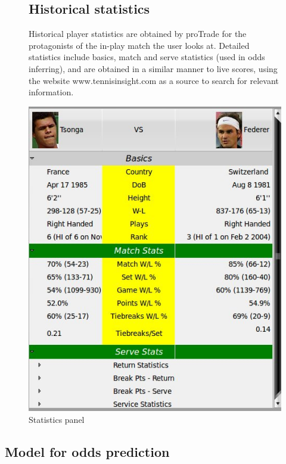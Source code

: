\documentclass[10pt]{report}
\begin{document}
\begin{figure}[ht]
\begin{minipage}[b]{7 cm}
\subsection {Historical statistics}
Historical player statistics are obtained by proTrade for the protagonists of the in-play match the user looks at. Detailed statistics include basics, match and serve statistics (used in odds inferring), and are obtained in a similar manner to live scores, using the website www.tennisinsight.com  as a source to search for relevant information.  
\end{minipage}
\begin{minipage}[b]{5 cm}
\centering
\includegraphics[bb=0 0 650 600, scale = 0.30]{features-screenshots/stats.jpg}
\caption{Statistics panel}
\end{minipage}
\end{figure}


\subsection {Model for odds prediction}
\end{document}
